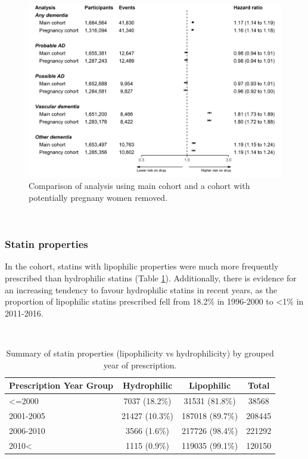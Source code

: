 \documentclass[a4paper, twoside]{templates/ociamthesis}
\begin{document}
\begin{figure}[H]
\includegraphics[width=1\linewidth]{figures/cprd-analysis/forester_pregnancy} \caption[Comparison of pregnancy analysis]{Comparison of analysis using main cohort and a cohort with potentially pregnany women removed.}\label{fig:pregnancyFig}
\end{figure}

~

\hypertarget{statin-properties-1}{%
\subsubsection{Statin properties}\label{statin-properties-1}}

In the cohort, statins with lipophilic properties were much more frequently prescribed than hydrophilic statins (Table \ref{tab:statinTypeTable-table}). Additionally, there is evidence for an increasing tendency to favour hydrophilic statins in recent years, as the proportion of lipophilic statins prescribed fell from 18.2\% in 1996-2000 to \textless1\% in 2011-2016.

~





\begin{table}[H]

\caption[Summary of statin properties (lipophilicity vs hydrophilicity).]{\label{tab:statinTypeTable-table}Summary of statin properties (lipophilicity vs hydrophilicity) by grouped year of prescription.}
\centering
\fontsize{7}{9}\selectfont
\begin{tabular}[t]{lccc}
\toprule
\textbf{\textbf{Prescription Year Group}} & \textbf{\textbf{Hydrophilic}} & \textbf{\textbf{Lipophilic}} & \textbf{\textbf{Total}}\\
\midrule
<=2000 & 7037 (18.2\%) & 31531 (81.8\%) & 38568\\
\midrule
2001-2005 & 21427 (10.3\%) & 187018 (89.7\%) & 208445\\
\midrule
2006-2010 & 3566 (1.6\%) & 217726 (98.4\%) & 221292\\
\midrule
2010< & 1115 (0.9\%) & 119035 (99.1\%) & 120150\\
\bottomrule
\end{tabular}
\end{table}
\end{document}

